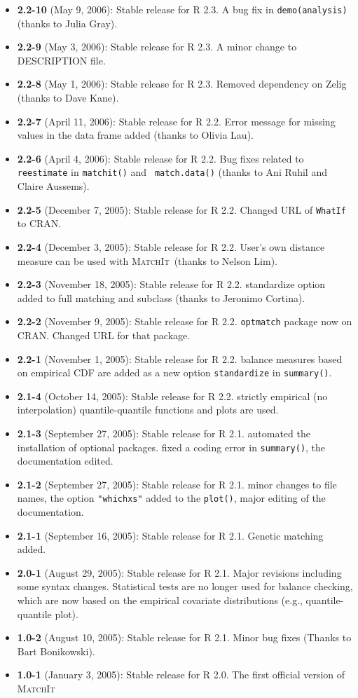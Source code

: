 \documentclass[oneside,letterpaper,12pt]{book}
\newcommand{\MatchIt}{\textsc{MatchIt}}
\begin{document}
\begin{itemize}
\item \textbf{2.2-10} (May 9, 2006): Stable release for R 2.3.
  A bug fix in {\tt demo(analysis)} (thanks to Julia Gray).
\item \textbf{2.2-9} (May 3, 2006): Stable release for R 2.3.
  A minor change to DESCRIPTION file.
\item \textbf{2.2-8} (May 1, 2006): Stable release for R 2.3.
  Removed dependency on Zelig (thanks to Dave Kane).
\item \textbf{2.2-7} (April 11, 2006): Stable release for R 2.2.
  Error message for missing values in the data frame added
  (thanks to Olivia Lau).
\item \textbf{2.2-6} (April 4, 2006): Stable release for R 2.2.
  Bug fixes related to {\tt reestimate} in {\tt matchit()} and {\tt
  match.data()} (thanks to Ani Ruhil and Claire Aussems). 
\item \textbf{2.2-5} (December 7, 2005): Stable release for R 2.2.
  Changed URL of {\tt WhatIf} to CRAN.
\item \textbf{2.2-4} (December 3, 2005): Stable release for R 2.2.
  User's own distance measure can be used with \MatchIt\, (thanks to
  Nelson Lim).
\item \textbf{2.2-3} (November 18, 2005): Stable release for R 2.2.
  standardize option added to full matching and subclass (thanks to
  Jeronimo Cortina).
\item \textbf{2.2-2} (November 9, 2005): Stable release for R 2.2.
  {\tt optmatch} package now on CRAN. Changed URL for that package. 
\item \textbf{2.2-1} (November 1, 2005): Stable release for R 2.2.
  balance measures based on empirical CDF are added as a new option
  {\tt standardize} in {\tt summary()}.
\item \textbf{2.1-4} (October 14, 2005): Stable release for R 2.2.
  strictly empirical (no interpolation) quantile-quantile functions
  and plots are used.
\item \textbf{2.1-3} (September 27, 2005): Stable release for R 2.1.
  automated the installation of optional packages. fixed a coding
  error in {\tt summary()}, the documentation edited.
\item \textbf{2.1-2} (September 27, 2005): Stable release for R 2.1.
  minor changes to file names, the option {\tt "whichxs"} added to the
  {\tt plot()}, major editing of the documentation.
\item \textbf{2.1-1} (September 16, 2005): Stable release for R
        2.1. Genetic matching added.    
\item \textbf{2.0-1} (August 29, 2005): Stable release for R 2.1.
  Major revisions including some syntax changes. Statistical tests are
  no longer used for balance checking, which are now based on the
  empirical covariate distributions (e.g., quantile-quantile plot).
\item \textbf{1.0-2} (August 10, 2005): Stable release for R
  2.1. Minor bug fixes (Thanks to Bart Bonikowski).
\item \textbf{1.0-1} (January 3, 2005): Stable release for R 2.0. The
  first official version of \MatchIt
\end{itemize}



\clearpage



\end{document}

